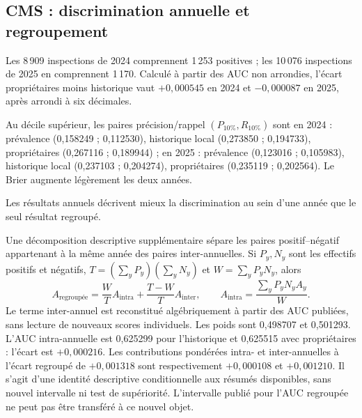 \subsection{CMS : discrimination annuelle et regroupement}
\label{sec:cmsannual}

\begin{table}[!htbp]
\centering\footnotesize
\caption{CMS : résultats de test par année, transcrits de l'analyse gelée. Les prévalences sont 14,0644\,\% en 2024 et 11,6118\,\% en 2025. L'AP utilise la convention de rang du code. Le supplément inclut la validation 2023\cite{hgbanalysis}.}
\label{tab:cmsannual}

\end{table}

Les 8\,909 inspections de 2024 comprennent 1\,253 positives ; les 10\,076 inspections de 2025 en comprennent 1\,170. Calculé à partir des AUC non arrondies, l'écart propriétaires moins historique vaut $+0,000545$ en 2024 et $-0,000087$ en 2025, après arrondi à six décimales.

Au décile supérieur, les paires précision/rappel $(P_{10\%},R_{10\%})$ sont en 2024 : prévalence (0,158249 ; 0,112530), historique local (0,273850 ; 0,194733), propriétaires (0,267116 ; 0,189944) ; en 2025 : prévalence (0,123016 ; 0,105983), historique local (0,237103 ; 0,204274), propriétaires (0,235119 ; 0,202564). Le Brier augmente légèrement les deux années.

Les résultats annuels décrivent mieux la discrimination au sein d'une année que le seul résultat regroupé.

Une décomposition descriptive supplémentaire sépare les paires positif--négatif appartenant à la même année des paires inter-annuelles. Si $P_y,N_y$ sont les effectifs positifs et négatifs, $T=(\sum_yP_y)(\sum_yN_y)$ et $W=\sum_yP_yN_y$, alors
\begin{equation}
 A_{\text{regroupée}}=\frac{W}{T} A_{\mathrm{intra}}+
 \frac{T-W}{T} A_{\mathrm{inter}},\qquad
 A_{\mathrm{intra}}=\frac{\sum_y P_yN_y A_y}{W}.
\label{eq:decomp}
\end{equation}
Le terme inter-annuel est reconstitué algébriquement à partir des AUC publiées, sans lecture de nouveaux scores individuels. Les poids sont 0,498707 et 0,501293. L'AUC intra-annuelle est 0,625299 pour l'historique et 0,625515 avec propriétaires : l'écart est $+0,000216$. Les contributions pondérées intra- et inter-annuelles à l'écart regroupé de $+0,001318$ sont respectivement $+0,000108$ et $+0,001210$. Il s'agit d'une identité descriptive conditionnelle aux résumés disponibles, sans nouvel intervalle ni test de supériorité. L'intervalle publié pour l'AUC regroupée ne peut pas être transféré à ce nouvel objet.

